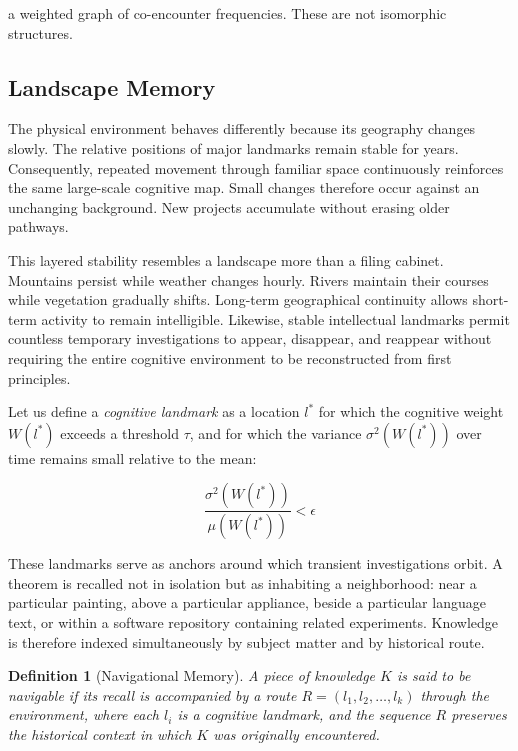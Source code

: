 \documentclass[12pt,oneside]{article}
\newtheorem{definition}{Definition}[section]
\theoremstyle{remark}
\begin{document}
a weighted graph of co-encounter frequencies. These are not isomorphic structures.

\subsection{Landscape Memory}

The physical environment behaves differently because its geography changes slowly. The relative positions of major landmarks remain stable for years. Consequently, repeated movement through familiar space continuously reinforces the same large-scale cognitive map. Small changes therefore occur against an unchanging background. New projects accumulate without erasing older pathways.

This layered stability resembles a landscape more than a filing cabinet. Mountains persist while weather changes hourly. Rivers maintain their courses while vegetation gradually shifts. Long-term geographical continuity allows short-term activity to remain intelligible. Likewise, stable intellectual landmarks permit countless temporary investigations to appear, disappear, and reappear without requiring the entire cognitive environment to be reconstructed from first principles.

Let us define a \emph{cognitive landmark} as a location $l^*$ for which the cognitive weight $W(l^*)$ exceeds a threshold $\tau$, and for which the variance $\sigma^2(W(l^*))$ over time remains small relative to the mean:

\begin{equation}
\frac{\sigma^2(W(l^*))}{\mu(W(l^*))} < \epsilon
\end{equation}

These landmarks serve as anchors around which transient investigations orbit. A theorem is recalled not in isolation but as inhabiting a neighborhood: near a particular painting, above a particular appliance, beside a particular language text, or within a software repository containing related experiments. Knowledge is therefore indexed simultaneously by subject matter and by historical route.

\begin{definition}[Navigational Memory]
A piece of knowledge $K$ is said to be navigable if its recall is accompanied by a route $R = (l_1, l_2, \ldots, l_k)$ through the environment, where each $l_i$ is a cognitive landmark, and the sequence $R$ preserves the historical context in which $K$ was originally encountered.
\end{definition}
\end{document}
